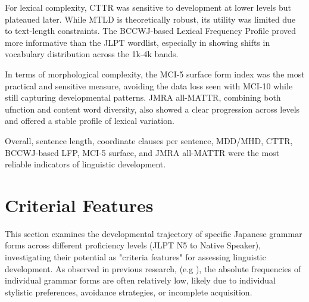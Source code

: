 For lexical complexity, CTTR was sensitive to development at lower levels but plateaued later. While MTLD is
theoretically robust, its utility was limited due to text-length constraints. The BCCWJ-based Lexical Frequency
Profile proved more informative than the JLPT wordlist, especially in showing shifts in vocabulary distribution
across the 1k-4k bands.

In terms of morphological complexity, the MCI-5 surface form index was the most practical and sensitive measure,
avoiding the data loss seen with MCI-10 while still capturing developmental patterns. JMRA all-MATTR, combining both
ufnction and content word diversity, also showed a clear progression across levels and offered a stable profile of
lexical variation.

Overall, sentence length, coordinate clauses per sentence, MDD/MHD, CTTR, BCCWJ-based LFP, MCI-5 surface, and JMRA
all-MATTR were the most reliable indicators of linguistic development.

\section{Criterial Features}







This section examines the developmental trajectory of specific Japanese grammar forms across different proficiency
levels (JLPT N5 to Native Speaker), investigating their potential  as "criteria features" for assessing linguistic
development. As observed in previous research, (e.g \citet{akef2025}), the absolute
frequencies of individual grammar
forms are often relatively low, likely due to individual stylistic preferences, avoidance strategies, or incomplete
acquisition.

